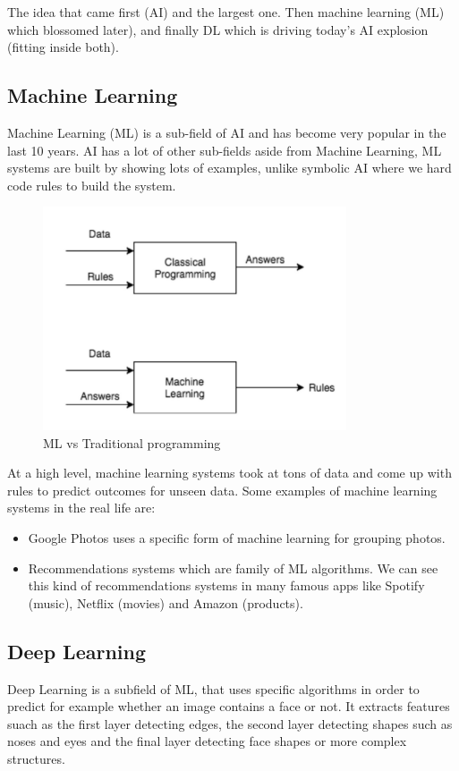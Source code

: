 The idea that came first (AI) and the largest one. Then machine learning (ML) which blossomed later), and finally  DL which is driving today's AI explosion (fitting inside both).

\subsection[Machine Learning]{Machine Learning}
Machine Learning (ML) is a sub-field of AI and has become very popular in the last 10 years. AI has a lot of other sub-fields aside from Machine Learning, ML systems are built by showing lots of examples, unlike symbolic AI where we hard code rules to build the system. 

\begin{figure}[H]
\centering
\includegraphics[width=0.8\textwidth]{./figures/ml-structure}
\caption{ML vs Traditional programming}
\end{figure}

At a high level, machine learning systems took at tons of data and come up with rules to predict outcomes for unseen data.
Some examples of machine learning systems in the real life are:

\begin{itemize}
\item Google Photos uses a specific form of machine learning for grouping photos.
\item Recommendations systems which are family of ML algorithms. We can see this kind of recommendations systems in many famous apps like Spotify (music), Netflix (movies) and Amazon (products).
\end{itemize}

\subsection[Deep Learning]{Deep Learning}
Deep Learning is a subfield of ML, that uses specific algorithms in order to predict for example whether an image contains a face or not. It extracts features suach as the first layer detecting edges, the second layer detecting shapes such as noses and eyes and the final layer detecting face shapes or more complex structures.

